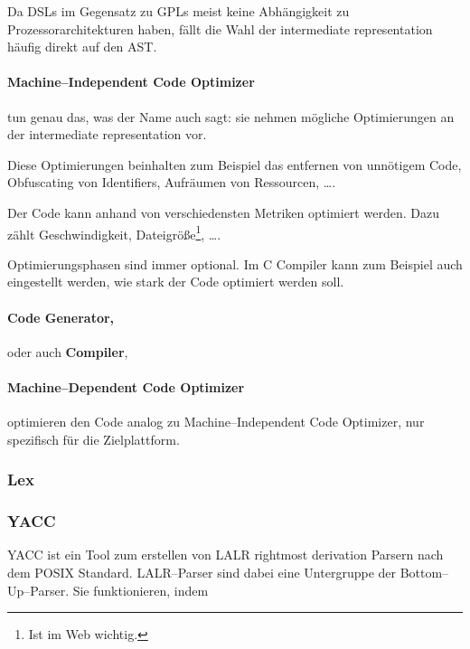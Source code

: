 Da \acp{DSL} im Gegensatz zu \acp{GPL} meist keine Abhängigkeit zu Prozessorarchitekturen haben, fällt die Wahl der intermediate representation häufig direkt auf den \ac{AST}.

\paragraph{Machine--Independent Code Optimizer} tun genau das, was der Name auch sagt: sie nehmen mögliche Optimierungen an der intermediate representation vor.

Diese Optimierungen beinhalten zum Beispiel das entfernen von unnötigem Code, Obfuscating von Identifiers, Aufräumen von Ressourcen, \dots.

Der Code kann anhand von verschiedensten Metriken optimiert werden.
Dazu zählt Geschwindigkeit, Dateigröße\footnote{Ist im Web wichtig.}, \dots.

Optimierungsphasen sind immer optional.
Im C Compiler kann zum Beispiel auch eingestellt werden, wie stark der Code optimiert werden soll.~\autocite{gnu-project-no-date}

\paragraph{Code Generator,} oder auch \textbf{Compiler}, \lipsum[5]

\paragraph{Machine--Dependent Code Optimizer} optimieren den Code analog zu Machine--Independent Code Optimizer, nur spezifisch für die Zielplattform.

\subsubsection{Lex}\label{subsubsec:lex}
\lipsum[5]

\lipsum[5]

\subsubsection{\acs{YACC}}
\ac{YACC} ist ein Tool zum erstellen von \ac{LALR} rightmost derivation Parsern nach dem \ac{POSIX} Standard.
\acs{LALR}--Parser sind dabei eine Untergruppe der Bottom--Up--Parser.
Sie funktionieren, indem \lipsum[5]

